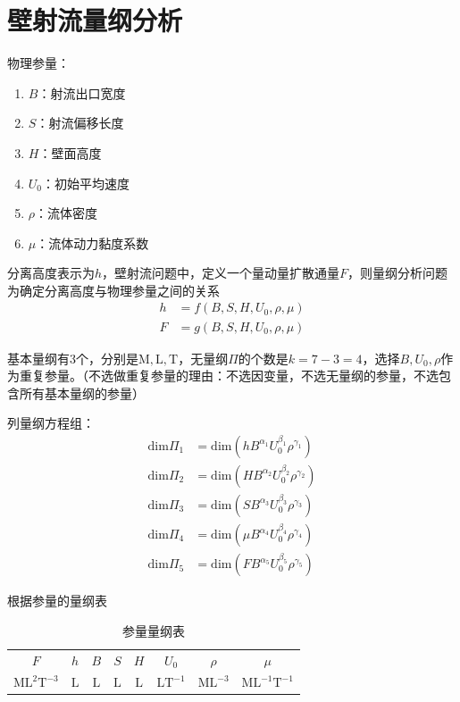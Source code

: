 \section{壁射流量纲分析}

物理参量：
\begin{enumerate}
    \item $B$：射流出口宽度
    \item $S$：射流偏移长度
    \item $H$：壁面高度
    \item $U_{0}$：初始平均速度
    \item $\rho$：流体密度
    \item $\mu$：流体动力黏度系数
\end{enumerate}

分离高度表示为$h$，壁射流问题中，定义一个量动量扩散通量$F$，则量纲分析问题为确定分离高度与物理参量之间的关系
\begin{align*}
    h&=f(B,S,H,U_{0},\rho,\mu)\\
    F&=g(B,S,H,U_{0},\rho,\mu)
\end{align*}

基本量纲有3个，分别是$\mathrm{M},\mathrm{L},\mathrm{T}$，无量纲$\Pi$的个数是$k=7-3=4$，选择$B,U_{0},\rho$作为重复参量。（不选做重复参量的理由：不选因变量，不选无量纲的参量，不选包含所有基本量纲的参量）

列量纲方程组：
\begin{align}
    \mathrm{dim}\Pi_{1}&=\mathrm{dim}(hB^{\alpha_{1}}U_{0}^{\beta_{1}}\rho^{\gamma_{1}})\\
    \mathrm{dim}\Pi_{2}&=\mathrm{dim}(HB^{\alpha_{2}}U_{0}^{\beta_{2}}\rho^{\gamma_{2}})\\
    \mathrm{dim}\Pi_{3}&=\mathrm{dim}(SB^{\alpha_{3}}U_{0}^{\beta_{3}}\rho^{\gamma_{3}})\\
    \mathrm{dim}\Pi_{4}&=\mathrm{dim}(\mu B^{\alpha_{4}}U_{0}^{\beta_{4}}\rho^{\gamma_{4}})\\
    \mathrm{dim}\Pi_{5}&=\mathrm{dim}(F B^{\alpha_{5}}U_{0}^{\beta_{5}}\rho^{\gamma_{5}})
\end{align}

根据参量的量纲表
\begin{table}[]
	\centering
	\begin{tabular}{cccccccc}
		 $F$& $h$&  $B$&  $S$&  $H$&  $U_{0}$&  $\rho$& $\mu$  \\
		 $\mathrm{ML^{2}T^{-3}}$&$\mathrm{L}$&  $\mathrm{L}$&  $\mathrm{L}$&  $\mathrm{L}$&  $\mathrm{LT^{-1}}$&  $\mathrm{ML^{-3}}$&$\mathrm{ML^{-1}T^{-1}}$  \\
	\end{tabular}
	\caption{参量量纲表}
	\label{tab:my-table}
\end{table}

